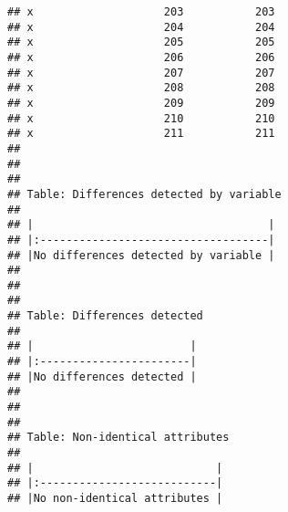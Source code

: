 \documentclass[
]{article}
\begin{document}
\begin{verbatim}
## x                    203           203
## x                    204           204
## x                    205           205
## x                    206           206
## x                    207           207
## x                    208           208
## x                    209           209
## x                    210           210
## x                    211           211
## 
## 
## 
## Table: Differences detected by variable
## 
## |                                    |
## |:-----------------------------------|
## |No differences detected by variable |
## 
## 
## 
## Table: Differences detected
## 
## |                        |
## |:-----------------------|
## |No differences detected |
## 
## 
## 
## Table: Non-identical attributes
## 
## |                            |
## |:---------------------------|
## |No non-identical attributes |
\end{verbatim}
\end{document}
